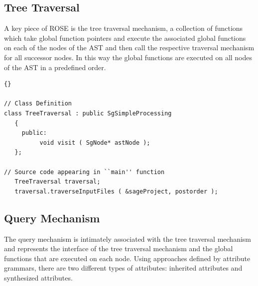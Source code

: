 \documentclass[10pt]{article}
\begin{document}


\subsection{Tree Traversal}

    A key piece of ROSE is the tree traversal mechanism, a collection of functions which take global
function pointers and execute the associated global functions on each of the nodes of the AST and
then call the respective traversal mechanism for all successor nodes.  In this way the global
functions are executed on all nodes of the AST in a predefined order.

\begin{lstlisting}{}

// Class Definition
class TreeTraversal : public SgSimpleProcessing
   {
     public:
          void visit ( SgNode* astNode );
   };

// Source code appearing in ``main'' function
   TreeTraversal traversal;
   traversal.traverseInputFiles ( &sageProject, postorder );

\end{lstlisting}


\subsection{Query Mechanism}

    The query mechanism is intimately associated with the tree traversal mechanism and represents
the interface of the tree traversal mechanism and the global functions that are executed on each
node.  Using approaches defined by attribute grammars, there are two different types of attributes:
inherited attributes and synthesized attributes.

\end{document}
